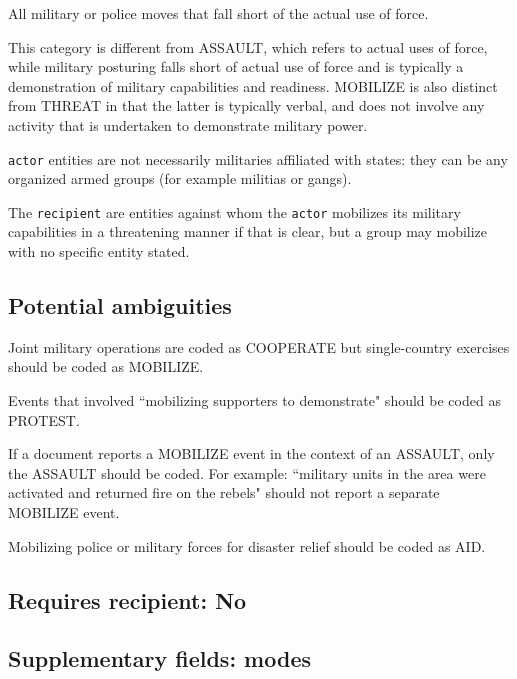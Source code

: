 \documentclass[11pt]{report}
\newcommand{\plcat}[1]{\textsf{#1}}
\newcommand{\txt}[1]{\texttt{#1}}
\begin{document}
All military or police moves that fall short of the actual use of force.

This category is different from \plcat{ASSAULT}, which refers to actual uses of force, while military posturing falls short of actual use of force and is typically a demonstration of military capabilities and readiness. \plcat{MOBILIZE} is also distinct from \plcat{THREAT} in that the latter is typically verbal, and does not involve any activity that is undertaken to demonstrate military power.

\txt{actor} entities  are not necessarily militaries affiliated with states: they can be any organized armed groups (for example militias or gangs).

The \txt{recipient} are entities against whom the \txt{actor} mobilizes its military capabilities in a threatening manner if that is clear, but a group may mobilize with no specific entity stated.

\subsection{Potential ambiguities}

Joint military operations are coded as \plcat{COOPERATE} but single-country exercises should be coded as \plcat{MOBILIZE}.

Events that involved ``mobilizing supporters to demonstrate" should be coded as \plcat{PROTEST}.

If a document reports a \plcat{MOBILIZE} event in the context of an \plcat{ASSAULT}, only the \plcat{ASSAULT} should be coded. For example: ``military units in the area were activated and returned fire on the rebels" should not report a separate \plcat{MOBILIZE} event.

Mobilizing police or military forces for disaster relief should be coded as \plcat{AID}.

\subsection{Requires recipient: No}

\subsection{Supplementary fields: modes }
\end{document}
